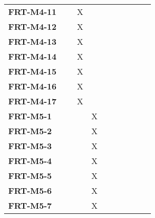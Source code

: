 \documentclass[12pt, titlepage]{article}
\begin{document}
\begin{longtable}{|l|ccccccc|}
	\textbf{FRT-M4-11} & ~                                        & X           & ~           & ~           & ~           & ~           & ~           \\
	\textbf{FRT-M4-12} & ~                                        & X           & ~           & ~           & ~           & ~           & ~           \\
	\textbf{FRT-M4-13} & ~                                        & X           & ~           & ~           & ~           & ~           & ~           \\
	\textbf{FRT-M4-14} & ~                                        & X           & ~           & ~           & ~           & ~           & ~           \\
	\textbf{FRT-M4-15} & ~                                        & X           & ~           & ~           & ~           & ~           & ~           \\
	\textbf{FRT-M4-16} & ~                                        & X           & ~           & ~           & ~           & ~           & ~           \\
	\textbf{FRT-M4-17} & ~                                        & X           & ~           & ~           & ~           & ~           & ~           \\
	\textbf{FRT-M5-1}  & ~                                        & ~           & X           & ~           & ~           & ~           & ~           \\
	\textbf{FRT-M5-2}  & ~                                        & ~           & X           & ~           & ~           & ~           & ~           \\
	\textbf{FRT-M5-3}  & ~                                        & ~           & X           & ~           & ~           & ~           & ~           \\
	\textbf{FRT-M5-4}  & ~                                        & ~           & X           & ~           & ~           & ~           & ~           \\
	\textbf{FRT-M5-5}  & ~                                        & ~           & X           & ~           & ~           & ~           & ~           \\
	\textbf{FRT-M5-6}  & ~                                        & ~           & X           & ~           & ~           & ~           & ~           \\
	\textbf{FRT-M5-7}  & ~                                        & ~           & X           & ~           & ~           & ~           & ~           \\

\end{longtable}
\end{document}
